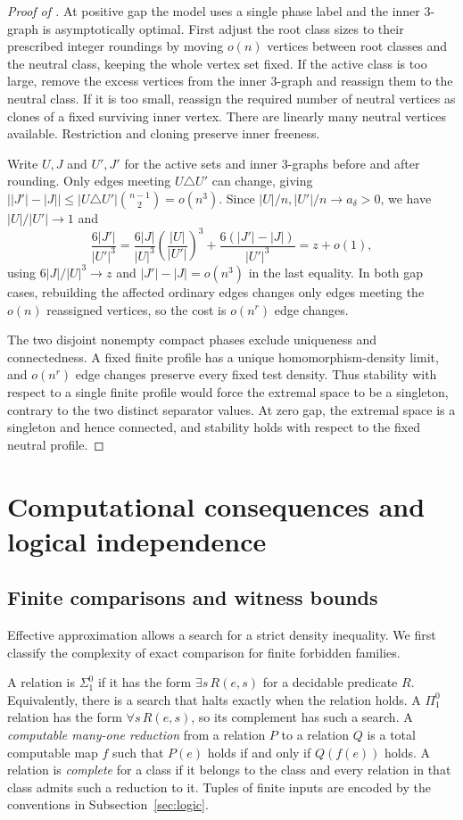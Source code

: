 \documentclass[10pt]{article}
\numberwithin{equation}{section}
\theoremstyle{definition}
\begin{document}
\begin{proof}[Proof of ]
At positive gap the model uses a single phase label and the inner $3$-graph is asymptotically optimal. First adjust the root class sizes to their prescribed integer roundings by moving $o(n)$ vertices between root classes and the neutral class, keeping the whole vertex set fixed. If the active class is too large, remove the excess vertices from the inner $3$-graph and reassign them to the neutral class. If it is too small, reassign the required number of neutral vertices as clones of a fixed surviving inner vertex. There are linearly many neutral vertices available. Restriction and cloning preserve inner freeness.

Write $U,J$ and $U',J'$ for the active sets and inner $3$-graphs before and after rounding. Only edges meeting $U\triangle U'$ can change, giving $\bigl||J'|-|J|\bigr|\le |U\triangle U'|\binom{n-1}{2}=o(n^3)$. Since $|U|/n,|U'|/n\to a_\delta>0$, we have $|U|/|U'|\to1$ and
\[
 \frac{6|J'|}{|U'|^3}
 =\frac{6|J|}{|U|^3}\left(\frac{|U|}{|U'|}\right)^3
  +\frac{6(|J'|-|J|)}{|U'|^3}=z+o(1),
\]
using $6|J|/|U|^3\to z$ and $|J'|-|J|=o(n^3)$ in the last equality. In both gap cases, rebuilding the affected ordinary edges changes only edges meeting the $o(n)$ reassigned vertices, so the cost is $o(n^r)$ edge changes.

The two disjoint nonempty compact phases exclude uniqueness and connectedness. A fixed finite profile has a unique homomorphism-density limit, and $o(n^r)$ edge changes preserve every fixed test density. Thus stability with respect to a single finite profile would force the extremal space to be a singleton, contrary to the two distinct separator values. At zero gap, the extremal space is a singleton and hence connected, and stability holds with respect to the fixed neutral profile.
\end{proof}

\section{Computational consequences and logical independence}\label{sec:consequences}
\subsection{Finite comparisons and witness bounds}
Effective approximation allows a search for a strict density inequality. We first classify the complexity of exact comparison for finite forbidden families.

A relation is \emph{$\Sigma^0_1$} if it has the form $\exists s\,R(e,s)$ for a decidable predicate $R$. Equivalently, there is a search that halts exactly when the relation holds. A \emph{$\Pi^0_1$} relation has the form $\forall s\,R(e,s)$, so its complement has such a search. A \emph{computable many-one reduction} from a relation $P$ to a relation $Q$ is a total computable map $f$ such that $P(e)$ holds if and only if $Q(f(e))$ holds. A relation is \emph{complete} for a class if it belongs to the class and every relation in that class admits such a reduction to it. Tuples of finite inputs are encoded by the conventions in Subsection~\ref{sec:logic}.
\end{document}
